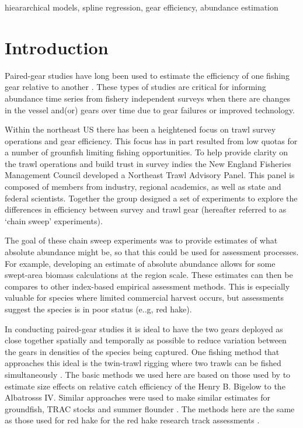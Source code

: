 \documentclass[]{article}
\begin{document}
hieararchical models, spline regression, gear efficiency, abundance
estimation

\pagebreak

\hypertarget{introduction}{%
\section{Introduction}\label{introduction}}

Paired-gear studies have long been used to estimate the efficiency of
one fishing gear relative to another
\citep[e.g.,][]{gulland64,bourne65}. These types of studies are critical
for informing abundance time series from fishery independent surveys
when there are changes in the vessel and(or) gears over time due to gear
failures or improved technology.

Within the northeast US there has been a heightened focus on trawl
survey operations and gear efficiency. This focus has in part resulted
from low quotas for a number of grounfish limiting fishing
opportunities. To help provide clarity on the trawl operations and build
trust in survey indies the New England Fisheries Management Council
developed a Northeast Trawl Advisory Panel. This panel is composed of
members from industry, regional academics, as well as state and federal
scientists. Together the group designed a set of experiments to explore
the differences in efficiency between survey and trawl gear (hereafter
referred to as `chain sweep' experiments).

The goal of these chain sweep experiments was to provide estimates of
what absolute abundance might be, so that this could be used for
assessment processes. For example, developing an estimate of absolute
abundance allows for some swept-area biomass calculations at the region
scale. These estimates can then be compares to other index-based
empirical assessment methods. This is especially valuable for species
where limited commercial harvest occurs, but assessments suggest the
species is in poor status (e..g, red hake).

In conducting paired-gear studies it is ideal to have the two gears
deployed as close together spatially and temporally as possible to
reduce variation between the gears in densities of the species being
captured. One fishing method that approaches this ideal is the
twin-trawl rigging where two trawls can be fished simultaneously
\citep{ices96}. The basic methods we used here are based on those used
by \citet{miller13} to estimate size effects on relative catch
efficiency of the Henry B. Bigelow to the Albatrosss IV. Similar
approaches were used to make similar estimates for groundfish, TRAC
stocks and summer flounder \citep{milleretal17a, milleretal17b}. The
methods here are the same as those used for red hake for the red hake
research track assessments \citep{milleretal20}.
\end{document}
